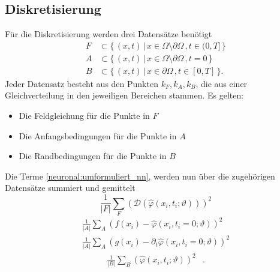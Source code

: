 \subsection{Diskretisierung}\label{neuronal:subsection:diskretierung}
Für die Diskretisierung werden drei Datensätze benötigt
\begin{equation}
    \begin{aligned}
        F &\subset \{\, (x, t) \,|\, x \in \Omega \setminus \partial \Omega\,, t \in (0,T] \,\}\\
        A &\subset \{\, (x, t) \,|\, x \in \Omega \setminus \partial \Omega\,, t = 0 \,\}\\
        B &\subset \{\, (x, t) \,|\, x \in \partial \Omega\,, t \in [0, T] \,\}.
    \end{aligned}
\end{equation}
Jeder Datensatz besteht aus den Punkten $k_F, k_A, k_B$, die aus einer Gleichverteilung in den jeweiligen Bereichen stammen.
Es gelten:
\begin{itemize}
    \item Die Feldgleichung für die Punkte in $F$
    \item Die Anfangsbedingungen für die Punkte in $A$
    \item Die Randbedingungen für die Punkte in $B$
\end{itemize}
Die Terme \eqref{neuronal:umformuliert_nn}, werden nun über die zugehörigen Datensätze summiert und gemittelt
\begin{equation}
  \frac{1}{\lvert F \rvert} \sum_{F}^{} \left(\mathcal{D}(\hat{\varphi}(x_i, t_i; \vartheta))\right)^2
    \label{neuronal:feldgleichung_umformuliert_netz_disk}
\end{equation}
\begin{equation}
    \begin{aligned}
        \frac{1}{\lvert A \rvert} \sum_{A}^{} \left(f(x_i) - \hat{\varphi}(x_i, t_i = 0; \vartheta)\right)^2\\
        \frac{1}{\lvert A \rvert} \sum_{A}^{} \left(g(x_i) - \partial_t \hat{\varphi}(x_i, t_i = 0; \vartheta)\right)^2
    \end{aligned}
    \label{neuronal:anfangsbedingung_umformuliert_netz_disk}
\end{equation}
\begin{equation}
    \begin{aligned}
        \frac{1}{\lvert B \rvert} \sum_{B}^{} \left(\hat{\varphi}(x_i, t_i; \vartheta)\right)^2 &.
    \end{aligned}
    \label{neuronal:randbedingung_umformuliert_netz_disk}
\end{equation}
